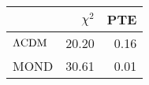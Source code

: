 \begin{tabular}{lrr}
\toprule
{} &  $\chi^2$ &  PTE \\
\midrule
$\Lambda \rm CDM$ &     20.20 & 0.16 \\
MOND              &     30.61 & 0.01 \\
\bottomrule
\end{tabular}
